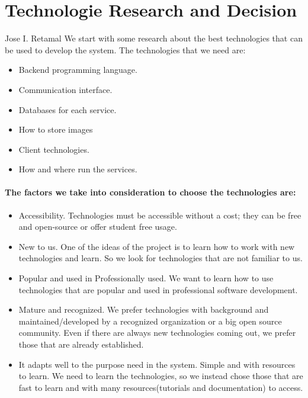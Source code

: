 \section{Technologie Research and Decision }
Jose I. Retamal
\vskip 0.1in
\indent
\indent
We start with some research about the best technologies that can be used to develop the system. The technologies that we need are:
\begin{itemize}
	\item Backend programming language.
	\item  Communication interface.
	\item  Databases for each service.
	\item  How to store images
	\item  Client technologies.
	\item  How and where run the services.
\end{itemize}



\paragraph{The factors we take into consideration to choose the technologies are:}

\begin{itemize}
	\item Accessibility. Technologies must be accessible without a cost; they can be free and open-source or offer student free usage.
	\item New to us. One of the ideas of the project is to learn how to work with new technologies and learn. So we look for technologies that are not familiar to us.
	
	\item Popular and used in 
	Professionally used. We want to learn how to use technologies that are popular and used in professional software development.
	
	\item Mature and recognized. We prefer technologies with background and maintained/developed by a recognized organization or a big open source community. Even if there are always new technologies coming out, we prefer those that are already established.
	
	\item It adapts well to the purpose need in the system.
	Simple and with resources to learn. We need to learn the technologies, so we instead chose those that are fast to learn and with many resources(tutorials and documentation) to access.
\end{itemize}
